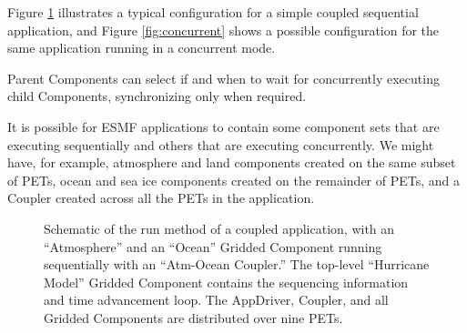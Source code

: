 Figure \ref{fig:serial} illustrates a typical configuration for 
a simple coupled sequential
application, and Figure \ref{fig:concurrent} shows a possible 
configuration for the same application running in a concurrent mode.

Parent Components can select if and when to wait for concurrently
executing child Components, synchronizing only when required.

It is possible for ESMF applications to contain some component sets
that are executing sequentially and others that are executing concurrently.
We might have, for example, atmosphere and land components created
on the same subset of PETs, ocean and sea ice components created on
the remainder of PETs, and a Coupler created across all the PETs in
the application.

\begin{center}
\begin{figure}
\caption{Schematic of the run method of a coupled application, with an
``Atmosphere'' and an ``Ocean'' Gridded Component running sequentially with 
an ``Atm-Ocean Coupler.''  The top-level ``Hurricane Model'' 
Gridded Component contains the sequencing information and time 
advancement loop.  The AppDriver, Coupler, and all Gridded Components 
are distributed over nine PETs.}
\label{fig:serial}
\end{figure}
\end{center}


